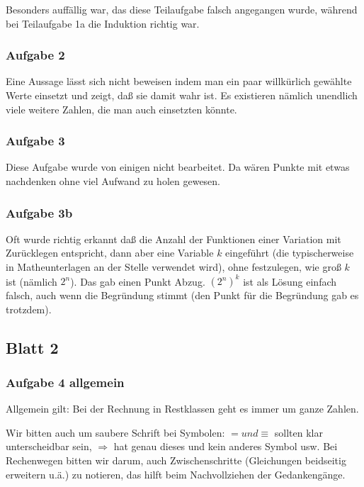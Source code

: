 \documentclass[%
	final, %
	normalheadings, %
	ngerman, %
	a4paper,
	1.1headlines, %
	pagesize, %
	halfparskip, %
	pointlessnumbers, %
	fleqn, %
]{scrartcl} %
\begin{document}
Besonders auffällig war, das diese Teilaufgabe falsch angegangen wurde, während
bei Teilaufgabe 1a die Induktion richtig war.

\subsubsection{Aufgabe 2}

Eine Aussage lässt sich nicht beweisen indem man ein paar willkürlich gewählte
Werte einsetzt und zeigt, daß sie damit wahr ist. Es existieren nämlich
unendlich viele weitere Zahlen, die man auch einsetzten könnte.

\subsubsection{Aufgabe 3}

Diese Aufgabe wurde von einigen nicht bearbeitet. Da wären Punkte mit etwas
nachdenken ohne viel Aufwand zu holen gewesen.

\subsubsection{Aufgabe 3b}

Oft wurde richtig erkannt daß die Anzahl der Funktionen einer Variation mit
Zurücklegen entspricht, dann aber eine Variable $k$ eingeführt (die
typischerweise in Matheunterlagen an der Stelle verwendet wird), ohne
festzulegen, wie groß $k$ ist (nämlich $2^n$). Das gab einen Punkt Abzug.
$(2^n)^k$ ist als Lösung einfach falsch, auch wenn die Begründung stimmt (den
Punkt für die Begründung gab es trotzdem).

\subsection{Blatt 2}

\subsubsection{Aufgabe 4 allgemein}

Allgemein gilt: Bei der Rechnung in Restklassen geht es immer um ganze Zahlen.

Wir bitten auch um saubere Schrift bei Symbolen: $= und \equiv$ sollten klar
unterscheidbar sein, $\Rightarrow$ hat genau dieses und kein anderes Symbol usw.
Bei Rechenwegen bitten wir darum, auch Zwischenschritte (Gleichungen beidseitig
erweitern u.ä.) zu notieren, das hilft beim Nachvollziehen der Gedankengänge.
\end{document}

